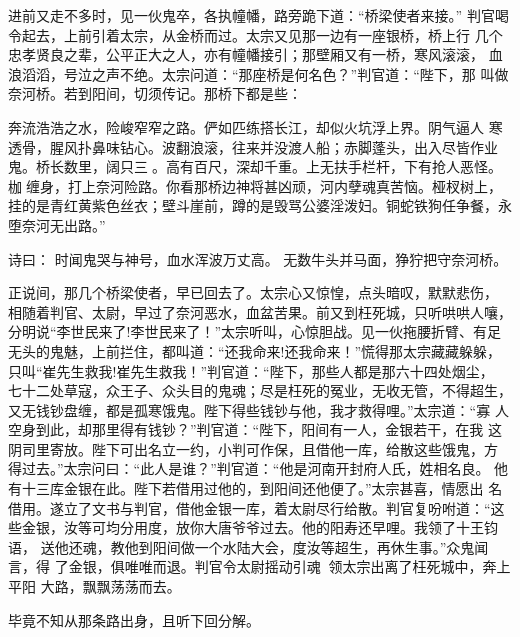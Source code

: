 进前又走不多时，见一伙鬼卒，各执幢幡，路旁跪下道：“桥梁使者来接。”
判官喝令起去，上前引着太宗，从金桥而过。太宗又见那一边有一座银桥，桥上行
几个忠孝贤良之辈，公平正大之人，亦有幢幡接引；那壁厢又有一桥，寒风滚滚，
血浪滔滔，号泣之声不绝。太宗问道：“那座桥是何名色？”判官道：“陛下，那
叫做奈河桥。若到阳间，切须传记。那桥下都是些：

奔流浩浩之水，险峻窄窄之路。俨如匹练搭长江，却似火坑浮上界。阴气逼人
寒透骨，腥风扑鼻味钻心。波翻浪滚，往来并没渡人船；赤脚蓬头，出入尽皆作业
鬼。桥长数里，阔只三。高有百尺，深却千重。上无扶手栏杆，下有抢人恶怪。
枷缠身，打上奈河险路。你看那桥边神将甚凶顽，河内孽魂真苦恼。桠杈树上，
挂的是青红黄紫色丝衣；壁斗崖前，蹲的是毁骂公婆淫泼妇。铜蛇铁狗任争餐，永
堕奈河无出路。”

诗曰：
时闻鬼哭与神号，血水浑波万丈高。
无数牛头并马面，狰狞把守奈河桥。

正说间，那几个桥梁使者，早已回去了。太宗心又惊惶，点头暗叹，默默悲伤，
相随着判官、太尉，早过了奈河恶水，血盆苦果。前又到枉死城，只听哄哄人嚷，
分明说“李世民来了!李世民来了！”太宗听叫，心惊胆战。见一伙拖腰折臂、有足
无头的鬼魅，上前拦住，都叫道：“还我命来!还我命来！”慌得那太宗藏藏躲躲，
只叫“崔先生救我!崔先生救我！”判官道：“陛下，那些人都是那六十四处烟尘，
七十二处草寇，众王子、众头目的鬼魂；尽是枉死的冤业，无收无管，不得超生，
又无钱钞盘缠，都是孤寒饿鬼。陛下得些钱钞与他，我才救得哩。”太宗道：“寡
人空身到此，却那里得有钱钞？”判官道：“陛下，阳间有一人，金银若干，在我
这阴司里寄放。陛下可出名立一约，小判可作保，且借他一库，给散这些饿鬼，方
得过去。”太宗问曰：“此人是谁？”判官道：“他是河南开封府人氏，姓相名良。
他有十三库金银在此。陛下若借用过他的，到阳间还他便了。”太宗甚喜，情愿出
名借用。遂立了文书与判官，借他金银一库，着太尉尽行给散。判官复吩咐道：“这
些金银，汝等可均分用度，放你大唐爷爷过去。他的阳寿还早哩。我领了十王钧语，
送他还魂，教他到阳间做一个水陆大会，度汝等超生，再休生事。”众鬼闻言，得
了金银，俱唯唯而退。判官令太尉摇动引魂，领太宗出离了枉死城中，奔上平阳
大路，飘飘荡荡而去。

毕竟不知从那条路出身，且听下回分解。